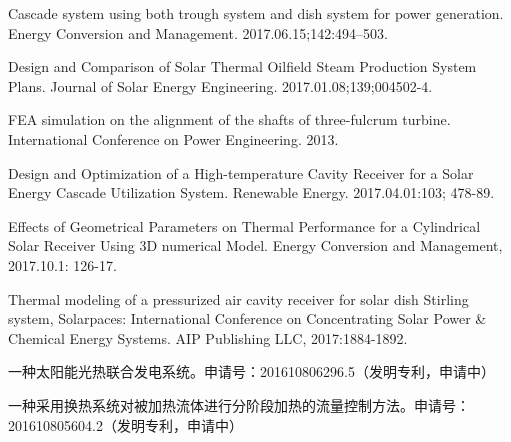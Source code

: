 \begin{publications}
  \item Cascade system using both trough system and dish system for power generation. Energy Conversion and Management. 2017.06.15;142:494–503.
  \item Design and Comparison of Solar Thermal Oilfield Steam Production System Plans. Journal of Solar Energy Engineering. 2017.01.08;139;004502-4.
  \item FEA simulation on the alignment of the shafts of three-fulcrum turbine. International Conference on Power Engineering. 2013.
  \item Design and Optimization of a High-temperature Cavity Receiver for a Solar Energy Cascade Utilization System. Renewable Energy. 2017.04.01:103; 478-89. 
  \item Effects of Geometrical Parameters on Thermal Performance for a Cylindrical Solar Receiver Using 3D numerical Model. Energy Conversion and Management, 2017.10.1: 126-17.
  \item Thermal modeling of a pressurized air cavity receiver for solar dish Stirling system, Solarpaces: International Conference on Concentrating Solar Power \& Chemical Energy Systems. AIP Publishing LLC, 2017:1884-1892.
  
  \item 一种太阳能光热联合发电系统。申请号：201610806296.5（发明专利，申请中）
  \item 一种采用换热系统对被加热流体进行分阶段加热的流量控制方法。申请号：201610805604.2（发明专利，申请中）
  
\end{publications}